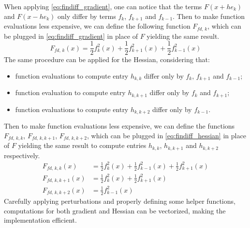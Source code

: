 When applying \ref{eq:findiff_gradient}, one can notice that the terms $F(x + he_k)$ and $F(x-he_k)$ only differ by terms $f_k$, $f_{k+1}$ and $f_{k-1}$.
Then to make function evaluations less expensive, we can define the following function $F_{\textit{fd},\,k}$, which can be plugged in \ref{eq:findiff_gradient} in place of $F$ yielding the same result.
\[
F_{\textit{fd},\,k}(x) = \frac12 f_k^2(x) + \frac12 f_{k+1}^2(x) + \frac12 f_{k-1}^2(x)
\]
The same procedure can be applied for the Hessian, considering that:
\begin{itemize}
    \item function evaluations to compute entry $h_{k,k}$ differ only by $f_k$, $f_{k+1}$ and $f_{k-1}$;
    \item function evaluation to compute entry $h_{k,k+1}$ differ only by $f_k$ and $f_{k+1}$;
    \item function evaluations to compute entry $h_{k,k+2}$ differ only by $f_{k-1}$.
\end{itemize}
Then to make function evaluations less expensive, we can define the functions $F_{\textit{fd},\,k,k}$, $F_{\textit{fd},\,k,k+1}$, $F_{\textit{fd},\,k,k+2}$, which can be plugged in \ref{eq:findiff_hessian} in place of $F$ yielding the same result to compute entries $h_{k,k}$, $h_{k,k+1}$ and $h_{k,k+2}$ respectively.
\begin{align*}
F_{\textit{fd},\,k,k}(x) &= \frac12 f_k^2(x) + \frac12 f_{k-1}^2(x) + \frac12 f_{k+1}^2(x)\\
F_{\textit{fd},\,k,k+1}(x) &= \frac12 f_k^2(x) + \frac12 f_{k+1}^2(x)\\
F_{\textit{fd},\,k,k+2}(x) &= \frac12 f_{k-1}^2(x)
\end{align*}
Carefully applying perturbations and properly defining some helper functions, computations for both gradient and Hessian can be vectorized, making the implementation efficient.